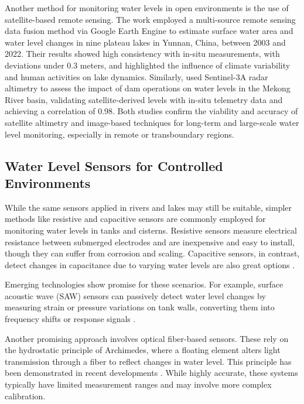 \documentclass[conference]{IEEEtran}
\begin{document}
Another method for monitoring water levels in open environments is the use of satellite-based remote sensing. The work \cite{jiang_2024_monitoring} employed a multi-source remote sensing data fusion method via Google Earth Engine to estimate surface water area and water level changes in nine plateau lakes in Yunnan, China, between 2003 and 2022. Their results showed high consistency with in-situ measurements, with deviations under 0.3 meters, and highlighted the influence of climate variability and human activities on lake dynamics. Similarly, \cite{ali_2024_satellite} used Sentinel-3A radar altimetry to assess the impact of dam operations on water levels in the Mekong River basin, validating satellite-derived levels with in-situ telemetry data and achieving a correlation of 0.98. Both studies confirm the viability and accuracy of satellite altimetry and image-based techniques for long-term and large-scale water level monitoring, especially in remote or transboundary regions.

\subsection{Water Level Sensors for Controlled Environments}

While the same sensors applied in rivers and lakes may still be suitable, simpler methods like resistive and capacitive sensors are commonly employed for monitoring water levels in tanks and cisterns. Resistive sensors measure electrical resistance between submerged electrodes and are inexpensive and easy to install, though they can suffer from corrosion and scaling. Capacitive sensors, in contrast, detect changes in capacitance due to varying water levels are also great options \cite{santana_2024_development, mohindru_2023_development}.

Emerging technologies show promise for these scenarios. For example, surface acoustic wave (SAW) sensors can passively detect water level changes by measuring strain or pressure variations on tank walls, converting them into frequency shifts or response signals \cite{ali_2020_saw, sreejith_2024_modeling}.

Another promising approach involves optical fiber-based sensors. These rely on the hydrostatic principle of Archimedes, where a floating element alters light transmission through a fiber to reflect changes in water level. This principle has been demonstrated in recent developments \cite{ramos_2025_high}. While highly accurate, these systems typically have limited measurement ranges and may involve more complex calibration.
\end{document}
